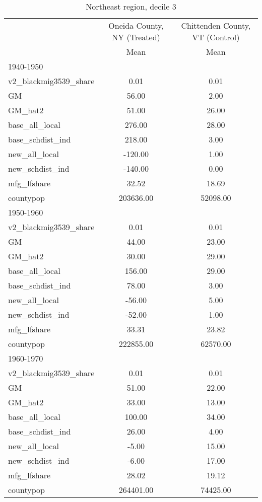\begin{table}[htbp]\centering
\def\sym#1{\ifmmode^{#1}\else\(^{#1}\)\fi}
\caption{Northeast region, decile 3 \label{tab1}}
\begin{tabular}{l*{2}{c}}
\toprule
                    &\multicolumn{1}{c}{Oneida County, NY (Treated)}&\multicolumn{1}{c}{Chittenden County, VT (Control)}\\
                    &        Mean&        Mean\\
\midrule
1940-1950           &            &            \\
v2\_blackmig3539\_share&        0.01&        0.01\\
GM                  &       56.00&        2.00\\
GM\_hat2             &       51.00&       26.00\\
base\_all\_local      &      276.00&       28.00\\
base\_schdist\_ind    &      218.00&        3.00\\
new\_all\_local       &     -120.00&        1.00\\
new\_schdist\_ind     &     -140.00&        0.00\\
mfg\_lfshare         &       32.52&       18.69\\
countypop           &   203636.00&    52098.00\\
\midrule
1950-1960           &            &            \\
v2\_blackmig3539\_share&        0.01&        0.01\\
GM                  &       44.00&       23.00\\
GM\_hat2             &       30.00&       29.00\\
base\_all\_local      &      156.00&       29.00\\
base\_schdist\_ind    &       78.00&        3.00\\
new\_all\_local       &      -56.00&        5.00\\
new\_schdist\_ind     &      -52.00&        1.00\\
mfg\_lfshare         &       33.31&       23.82\\
countypop           &   222855.00&    62570.00\\
\midrule
1960-1970           &            &            \\
v2\_blackmig3539\_share&        0.01&        0.01\\
GM                  &       51.00&       22.00\\
GM\_hat2             &       33.00&       13.00\\
base\_all\_local      &      100.00&       34.00\\
base\_schdist\_ind    &       26.00&        4.00\\
new\_all\_local       &       -5.00&       15.00\\
new\_schdist\_ind     &       -6.00&       17.00\\
mfg\_lfshare         &       28.02&       19.12\\
countypop           &   264401.00&    74425.00\\
\bottomrule
\end{tabular}
\end{table}
